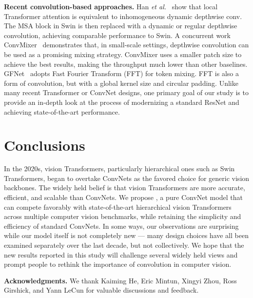 \documentclass[10pt,twocolumn,letterpaper]{article}
\renewcommand{\paragraph}[1]{\vspace{1.25mm}\noindent\textbf{#1}}
\begin{document}
\paragraph{Recent convolution-based approaches.} Han \emph{et al.}~\cite{han2021demystifying} show that local Transformer attention is equivalent to inhomogeneous dynamic depthwise conv. The MSA block in Swin is then replaced with a dynamic or regular depthwise convolution, achieving comparable performance to Swin. A concurrent work ConvMixer~\cite{convmixer} demonstrates that, in small-scale settings, depthwise convolution can be used as a promising mixing strategy. ConvMixer uses a smaller patch size to achieve the best results, making the throughput much lower than other baselines. GFNet~\cite{rao2021global} adopts Fast Fourier Transform (FFT) for token mixing. FFT is also a form of convolution, but with a global kernel size and circular padding. Unlike many recent Transformer or ConvNet designs, one primary goal of our study is to provide an in-depth look at the process of modernizing a standard ResNet and achieving state-of-the-art performance.

\section{Conclusions}
In the 2020s, vision Transformers, particularly hierarchical ones such as Swin Transformers, began to overtake ConvNets as the favored choice for generic vision backbones. The widely held belief is that vision Transformers are more accurate, efficient, and scalable than ConvNets. We propose , a pure ConvNet model that can compete favorably with state-of-the-art hierarchical vision Transformers across multiple computer vision benchmarks, while retaining the simplicity and efficiency of standard ConvNets. In some ways, our observations are surprising while our \cnn{} model itself is not completely new --- many design choices have all been examined separately over the last decade, but not collectively. We hope that the new results reported in this study will challenge several widely held views and prompt people to rethink the importance of convolution in computer vision.

\paragraph{Acknowledgments.} We thank Kaiming He, Eric Mintun, Xingyi Zhou, Ross Girshick, and Yann LeCun for valuable discussions and feedback.
\end{document}
